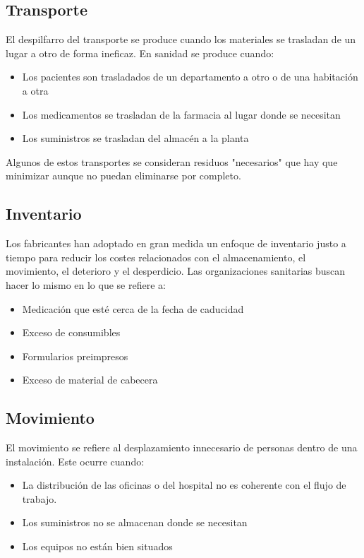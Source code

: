 \subsection{Transporte}

El despilfarro del transporte se produce cuando los materiales se trasladan de un lugar a otro de forma ineficaz. En sanidad se produce cuando:

\begin{itemize}
    \item Los pacientes son trasladados de un departamento a otro o de una habitación a otra
    \item Los medicamentos se trasladan de la farmacia al lugar donde se necesitan
    \item Los suministros se trasladan del almacén a la planta
\end{itemize}

Algunos de estos transportes se consideran residuos "necesarios" que hay que minimizar aunque no puedan eliminarse por completo.

\subsection{Inventario}

Los fabricantes han adoptado en gran medida un enfoque de inventario justo a tiempo para reducir los costes relacionados con el almacenamiento, el movimiento, el deterioro y el desperdicio.
Las organizaciones sanitarias buscan hacer lo mismo en lo que se refiere a:

\begin{itemize}
    \item Medicación que esté cerca de la fecha de caducidad
    \item Exceso de consumibles
    \item Formularios preimpresos
    \item Exceso de material de cabecera
\end{itemize}

\subsection{Movimiento}

El movimiento se refiere al desplazamiento innecesario de personas dentro de una instalación.
Este ocurre cuando:

\begin{itemize}
    \item La distribución de las oficinas o del hospital no es coherente con el flujo de trabajo.
    \item Los suministros no se almacenan donde se necesitan
    \item Los equipos no están bien situados
\end{itemize}

